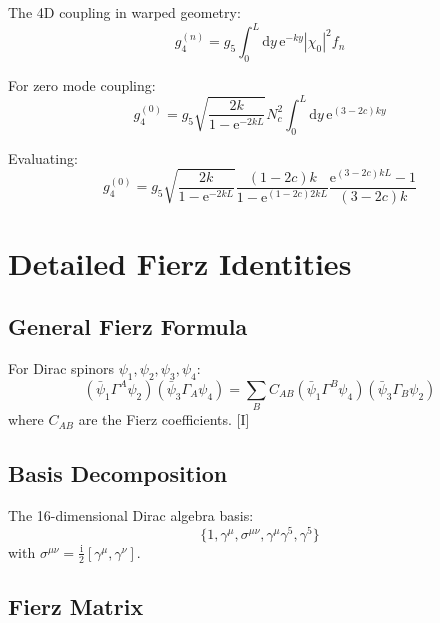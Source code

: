 \documentclass[11pt,a4paper]{article}
\newcommand{\dd}{\mathrm{d}}
\newcommand{\ii}{\mathrm{i}}
\newcommand{\ee}{\mathrm{e}}
\begin{document}
The 4D coupling in warped geometry:
\begin{equation}
g_4^{(n)} = g_5 \int_0^L \dd y\, \ee^{-ky} |\chi_0|^2 f_n
\label{eq:warped-coupling}
\end{equation}

For zero mode coupling:
\begin{equation}
g_4^{(0)} = g_5 \sqrt{\frac{2k}{1-\ee^{-2kL}}} N_c^2 \int_0^L \dd y\, \ee^{(3-2c)ky}
\label{eq:warped-g0}
\end{equation}

Evaluating:
\begin{equation}
g_4^{(0)} = g_5 \sqrt{\frac{2k}{1-\ee^{-2kL}}} \frac{(1-2c)k}{1-\ee^{(1-2c)2kL}}
\frac{\ee^{(3-2c)kL} - 1}{(3-2c)k}
\label{eq:warped-g0-explicit}
\end{equation}

\section{Detailed Fierz Identities}
\label{app:fierz}

\subsection{General Fierz Formula}

For Dirac spinors $\psi_1, \psi_2, \psi_3, \psi_4$:
\begin{equation}
(\bar{\psi}_1 \Gamma^A \psi_2)(\bar{\psi}_3 \Gamma_A \psi_4)
= \sum_B C_{AB} (\bar{\psi}_1 \Gamma^B \psi_4)(\bar{\psi}_3 \Gamma_B \psi_2)
\label{eq:fierz-general}
\end{equation}
where $C_{AB}$ are the Fierz coefficients. [I]

\subsection{Basis Decomposition}

The 16-dimensional Dirac algebra basis:
\begin{equation}
\{1, \gamma^\mu, \sigma^{\mu\nu}, \gamma^\mu\gamma^5, \gamma^5\}
\label{eq:dirac-basis}
\end{equation}
with $\sigma^{\mu\nu} = \frac{\ii}{2}[\gamma^\mu, \gamma^\nu]$.

\subsection{Fierz Matrix}
\end{document}
